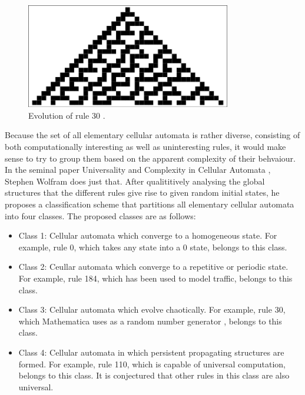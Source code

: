 \documentclass[12pt]{article}
\begin{document}
\begin{figure} [!h]
\begin{center}
\includegraphics[width=0.8\textwidth]{eca-dynamics-example}
\caption{Evolution of rule 30 \cite{weisstein-eca}.}
\label{fig:eca-rule-dynamics}
\end{center}
\end{figure} 

Because the set of all elementary cellular automata is rather diverse, consisting of both computationally interesting as well as uninteresting rules, it would make sense to try to group them based on the apparent complexity of their behvaiour. In the seminal paper Universality and Complexity in Cellular Automata \cite{wolfram-classification}, Stephen Wolfram does just that. After qualititively analysing the global structures that the different rules give rise to given random initial states, he proposes a classification scheme that partitions all elementary cellular automata into four classes. The proposed classes are as follows:

\begin{itemize}
\item Class 1: Cellular automata which converge to a homogeneous state. For example, rule 0, which takes any state into a 0 state, belongs to this class.
\item Class 2: Ceullar automata which converge to a repetitive or periodic state. For example, rule 184, which has been used to model traffic, belongs to this class.
\item Class 3: Cellular automata which evolve chaotically. For example, rule 30, which Mathematica uses as a random number generator \cite{NKS}, belongs to this class.
\item Class 4: Cellular automata in which persistent propagating structures are formed. For example, rule 110, which is capable of universal computation, belongs to this class. It is conjectured that other rules in this class are also universal. 
\end{itemize}
\end{document}
